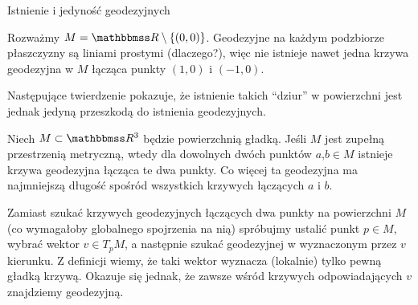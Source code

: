 \begin{frame}{Istnienie i jedyność geodezyjnych}
\begin{przyklad}
Rozważmy $M=\R\setminus\{(0,0)\}$. Geodezyjne na każdym podzbiorze płaszczyzny są liniami prostymi (dlaczego?), więc nie istnieje nawet jedna krzywa geodezyjna w $M$ łącząca punkty $(1,0)$ i $(-1,0)$.
\end{przyklad}

\pause Następujące twierdzenie pokazuje, że istnienie takich ``dziur'' w powierzchni jest jednak jedyną przeszkodą do istnienia geodezyjnych.

\end{frame}
\begin{frame}
\begin{twierdzenie}
Niech $M\subset \R^3$ będzie powierzchnią gładką. Jeśli $M$ jest zupełną przestrzenią metryczną, wtedy dla dowolnych dwóch punktów $a$,$b\in M$ istnieje krzywa geodezyjna łącząca te dwa punkty. Co więcej ta geodezyjna ma najmniejszą długość spośród wszystkich krzywych łączących $a$ i $b$.
\end{twierdzenie}

\pause
{}
\end{frame}

Zamiast szukać krzywych geodezyjnych łączących dwa punkty na powierzchni $M$ (co wymagałoby globalnego spojrzenia na nią) spróbujmy ustalić punkt $p\in M$, wybrać wektor $v\in T_pM$, a następnie szukać geodezyjnej w wyznaczonym przez $v$ kierunku. \pause Z definicji wiemy, że taki wektor wyznacza (lokalnie) tylko pewną gładką krzywą. Okazuje się jednak, że zawsze wśród krzywych odpowiadających $v$ znajdziemy geodezyjną.

